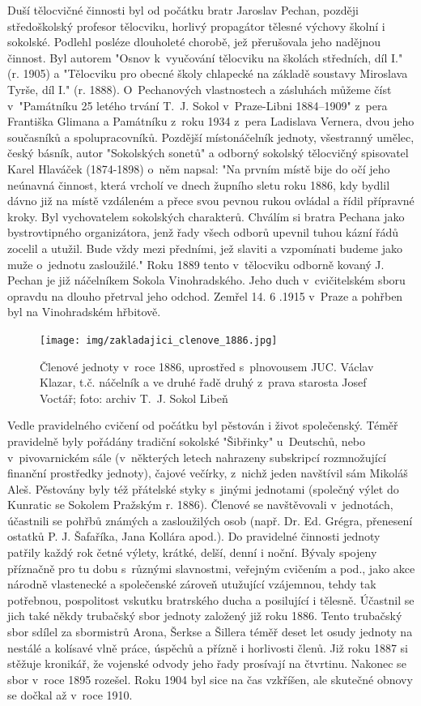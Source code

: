 \documentclass[a5paper, 12pt, twoside]{article}
\begin{document}
Duší tělocvičné činnosti byl od počátku bratr Jaroslav Pechan, později středoškolský profesor tělocviku, horlivý propagátor tělesné výchovy školní i sokolské. Podlehl posléze dlouholeté chorobě, jež přerušovala jeho nadějnou činnost. Byl autorem "Osnov k~vyučování tělocviku na školách středních, díl I." (r. 1905) a "Tělocviku pro obecné školy chlapecké na základě soustavy Miroslava Tyrše, díl I." (r. 1888). O~Pechanových vlastnostech a zásluhách můžeme číst v~"Památníku 25 letého trvání T.~J.  Sokol v~Praze-Libni 1884–⁠⁠⁠⁠⁠⁠1909" z~pera Františka Glimana a Památníku z~roku 1934 z~pera Ladislava Vernera, dvou jeho současníků a spolupracovníků. Pozdější místonáčelník jednoty, všestranný umělec, český básník, autor "Sokolských sonetů" a odborný sokolský tělocvičný spisovatel Karel Hlaváček (1874-1898) o~něm napsal: "Na prvním místě bije do očí jeho neúnavná činnost, která vrcholí ve dnech župního sletu roku 1886, kdy bydlil dávno již na místě vzdáleném a přece svou pevnou rukou ovládal a řídil přípravné kroky. Byl vychovatelem sokolských  charakterů.  Chválím si bratra Pechana jako bystrovtipného organizátora, jenž řady všech odborů upevnil tuhou kázní řádů zocelil a utužil. Bude vždy mezi předními, jež slaviti a vzpomínati budeme jako muže o~jednotu zasloužilé." Roku 1889 tento v~tělocviku odborně kovaný J. Pechan je již náčelníkem Sokola Vinohradského. Jeho duch v~cvičitelském sboru opravdu na dlouho přetrval jeho odchod. Zemřel 14. 6 .1915 v~Praze a pohřben byl na Vinohradském hřbitově.

\begin{figure}[h!]
  \centering
  \texttt{[image: img/zakladajici\_clenove\_1886.jpg]}
  \caption*{Členové jednoty v~roce 1886, uprostřed s~plnovousem JUC. Václav Klazar, t.č. náčelník a ve druhé řadě druhý z~prava starosta Josef Voctář; foto: archiv T.~J. Sokol Libeň}
\end{figure}

Vedle pravidelného cvičení od počátku byl pěstován i život společenský. Téměř pravidelně byly pořádány tradiční sokolské "Šibřinky" u~Deutschů, nebo v~pivovarnickém sále (v~některých letech nahrazeny subskripcí rozmnožující finanční prostředky jednoty), čajové večírky, z~nichž jeden navštívil sám Mikoláš Aleš. Pěstovány byly též přátelské styky s~jinými jednotami (společný výlet do Kunratic se Sokolem Pražským r. 1886). Členové se navštěvovali v~jednotách, účastnili se pohřbů známých a zasloužilých osob (např. Dr. Ed. Grégra, přenesení ostatků P. J. Šafaříka, Jana Kollára apod.). Do pravidelné činnosti jednoty patřily každý rok četné výlety, krátké, delší, denní i noční. Bývaly spojeny příznačně pro tu dobu s~různými slavnostmi, veřejným cvičením a pod., jako akce národně vlastenecké a společenské zároveň utužující vzájemnou, tehdy tak potřebnou, pospolitost vskutku bratrského ducha a posilující i tělesně. Účastnil se jich také někdy trubačský sbor jednoty založený již roku 1886. Tento trubačský sbor sdílel za sbormistrů Arona, Šerkse a Šillera téměř deset let osudy jednoty na nestálé a kolísavé vlně práce, úspěchů a přízně i horlivosti členů. Již roku 1887 si stěžuje kronikář, že vojenské odvody jeho řady prosívají na čtvrtinu. Nakonec se sbor v~roce 1895 rozešel. Roku 1904 byl sice na čas vzkříšen, ale skutečné obnovy se dočkal až v~roce 1910.
\end{document}
